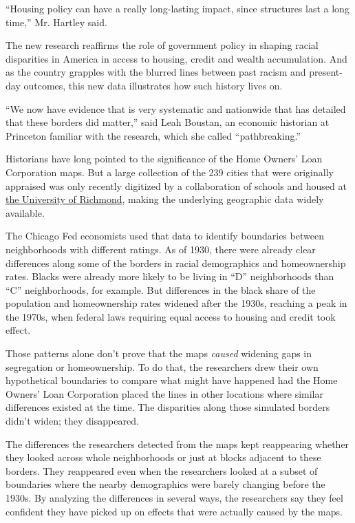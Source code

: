 ``Housing policy can have a really long-lasting impact, since structures
last a long time,'' Mr. Hartley said.

The new research reaffirms the role of government policy in shaping
racial disparities in America in access to housing, credit and wealth
accumulation. And as the country grapples with the blurred lines between
past racism and present-day outcomes, this new data illustrates how such
history lives on.

``We now have evidence that is very systematic and nationwide that has
detailed that these borders did matter,'' said Leah Boustan, an economic
historian at Princeton familiar with the research, which she called
``pathbreaking.''

Historians have long pointed to the significance of the Home Owners'
Loan Corporation maps. But a large collection of the 239 cities that
were originally appraised was only recently digitized by a collaboration
of schools and housed at
\href{https://dsl.richmond.edu/panorama/redlining/\#loc=5/39.105/-94.583\&opacity=0.8}{the
University of Richmond}, making the underlying geographic data widely
available.

The Chicago Fed economists used that data to identify boundaries between
neighborhoods with different ratings. As of 1930, there were already
clear differences along some of the borders in racial demographics and
homeownership rates. Blacks were already more likely to be living in
``D'' neighborhoods than ``C'' neighborhoods, for example. But
differences in the black share of the population and homeownership rates
widened after the 1930s, reaching a peak in the 1970s, when federal laws
requiring equal access to housing and credit took effect.

Those patterns alone don't prove that the maps \emph{caused} widening
gaps in segregation or homeownership. To do that, the researchers drew
their own hypothetical boundaries to compare what might have happened
had the Home Owners' Loan Corporation placed the lines in other
locations where similar differences existed at the time. The disparities
along those simulated borders didn't widen; they disappeared.

The differences the researchers detected from the maps kept reappearing
whether they looked across whole neighborhoods or just at blocks
adjacent to these borders. They reappeared even when the researchers
looked at a subset of boundaries where the nearby demographics were
barely changing before the 1930s. By analyzing the differences in
several ways, the researchers say they feel confident they have picked
up on effects that were actually caused by the maps.

